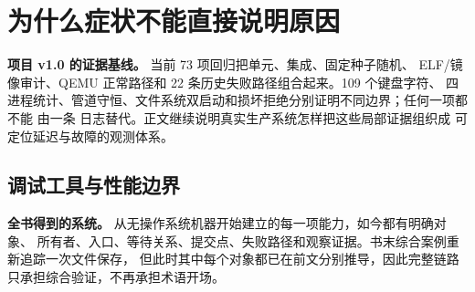 \chapter{为什么症状不能直接说明原因}

\begin{statebox}
\textbf{项目 v1.0 的证据基线。} 当前 73 项回归把单元、集成、固定种子随机、
ELF/镜像审计、QEMU 正常路径和 22 条历史失败路径组合起来。109 个键盘字符、
四进程统计、管道守恒、文件系统双启动和损坏拒绝分别证明不同边界；任何一项都不能
由一条  日志替代。正文继续说明真实生产系统怎样把这些局部证据组织成
可定位延迟与故障的观测体系。
\end{statebox}


\section{调试工具与性能边界}

\begin{problemframe}
\textbf{全书得到的系统。} 从无操作系统机器开始建立的每一项能力，如今都有明确对象、
所有者、入口、等待关系、提交点、失败路径和观察证据。书末综合案例重新追踪一次文件保存，
但此时其中每个对象都已在前文分别推导，因此完整链路只承担综合验证，不再承担术语开场。
\end{problemframe}
